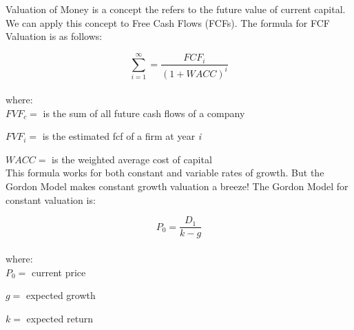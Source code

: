 \documentclass[a4paper,12pt]{article}
\begin{document}
\pagestyle{headings}


Valuation of Money is a concept the refers to the future value of 
current capital. We can apply this concept to Free Cash Flows 
(FCFs). The formula for FCF Valuation is as follows:
				
\[ \sum_{i=1}^\infty = \frac{FCF_i}{(1+WACC)^i} \]
\\
where:\\
	
$FVF_c =$ is the sum of all future cash flows of a company

$FVF_i =$ is the estimated fcf of a firm at year \textit{i}

$WACC =$ is the weighted average cost of capital\\

This formula works for both constant and variable rates of growth. 
But the Gordon Model makes constant growth valuation a breeze! 
The Gordon Model for constant valuation is:

\[ P_0 = \frac{D_1}{k-g} \]
\\
where:\\

$P_0 =$ current price

$g =$ expected growth

$k=$ expected return
\end{document}
